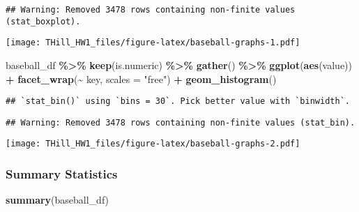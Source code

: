 \documentclass[
]{article}
\newenvironment{Shaded}{\begin{snugshade}}{\end{snugshade}}
\newcommand{\DataTypeTok}[1]{\textcolor[rgb]{0.13,0.29,0.53}{#1}}
\newcommand{\KeywordTok}[1]{\textcolor[rgb]{0.13,0.29,0.53}{\textbf{#1}}}
\newcommand{\NormalTok}[1]{#1}
\newcommand{\OperatorTok}[1]{\textcolor[rgb]{0.81,0.36,0.00}{\textbf{#1}}}
\newcommand{\StringTok}[1]{\textcolor[rgb]{0.31,0.60,0.02}{#1}}
\begin{document}
\begin{verbatim}
## Warning: Removed 3478 rows containing non-finite values (stat_boxplot).
\end{verbatim}

\texttt{[image: THill\_HW1\_files/figure-latex/baseball-graphs-1.pdf]}

\begin{Shaded}
\begin{Highlighting}[]
\NormalTok{baseball\_df }\OperatorTok{\%\textgreater{}\%}
\StringTok{  }\KeywordTok{keep}\NormalTok{(is.numeric) }\OperatorTok{\%\textgreater{}\%}
\StringTok{  }\KeywordTok{gather}\NormalTok{() }\OperatorTok{\%\textgreater{}\%}\StringTok{ }
\StringTok{  }\KeywordTok{ggplot}\NormalTok{(}\KeywordTok{aes}\NormalTok{(value)) }\OperatorTok{+}
\StringTok{    }\KeywordTok{facet\_wrap}\NormalTok{(}\OperatorTok{\textasciitilde{}}\StringTok{ }\NormalTok{key, }\DataTypeTok{scales =} \StringTok{"free"}\NormalTok{) }\OperatorTok{+}
\StringTok{    }\KeywordTok{geom\_histogram}\NormalTok{()}
\end{Highlighting}
\end{Shaded}

\begin{verbatim}
## `stat_bin()` using `bins = 30`. Pick better value with `binwidth`.
\end{verbatim}

\begin{verbatim}
## Warning: Removed 3478 rows containing non-finite values (stat_bin).
\end{verbatim}

\texttt{[image: THill\_HW1\_files/figure-latex/baseball-graphs-2.pdf]}

\hypertarget{summary-statistics}{%
\subsubsection{Summary Statistics}\label{summary-statistics}}

\begin{Shaded}
\begin{Highlighting}[]
\KeywordTok{summary}\NormalTok{(baseball\_df)}
\end{Highlighting}
\end{Shaded}
\end{document}
